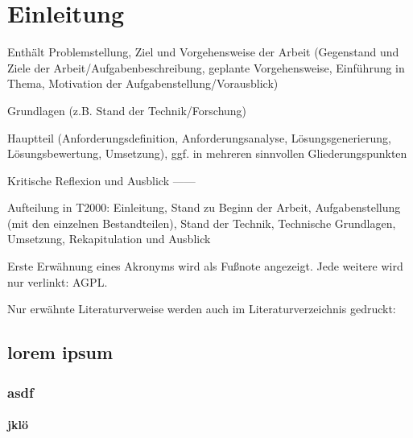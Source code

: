 
\chapter{Einleitung}
Enthält Problemstellung, Ziel und Vorgehensweise der Arbeit (Gegenstand und Ziele der Arbeit/Aufgabenbeschreibung,
geplante Vorgehensweise, Einführung in Thema, Motivation der Aufgabenstellung/Vorausblick)

Grundlagen (z.B. Stand der Technik/Forschung)

Hauptteil (Anforderungsdefinition, Anforderungsanalyse, Lösungsgenerierung, Lösungsbewertung, Umsetzung),
ggf. in mehreren sinnvollen Gliederungspunkten

Kritische Reflexion und Ausblick
------

Aufteilung in T2000: Einleitung, Stand zu Beginn der Arbeit, Aufgabenstellung (mit den einzelnen Bestandteilen), Stand der Technik, Technische Grundlagen, Umsetzung, Rekapitulation und Ausblick

Erste Erwähnung eines Akronyms wird als Fußnote angezeigt. Jede weitere wird
nur verlinkt: \acf{AGPL}. \cite{appleDesignGuide, appleMfiProgram}

Nur erwähnte Literaturverweise werden auch im Literaturverzeichnis gedruckt:
\cites[150--130]{siliconBLE}[S.~150f.]{hornppm}

\lipsum[1]

\section{lorem ipsum}

\subsection{asdf}
\subsubsection{jklö}